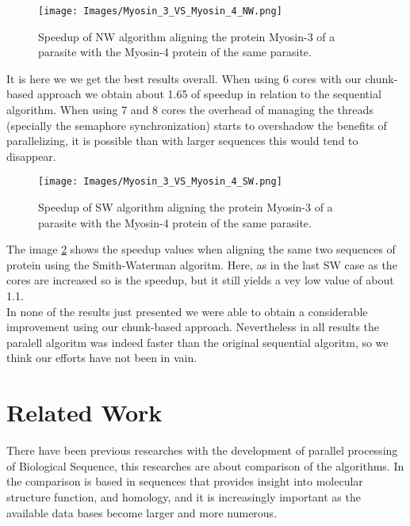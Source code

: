 \documentclass[journal]{IEEEtran}
\begin{document}
\begin{figure}[h]
  \begin{center}
    \texttt{[image: Images/Myosin\_3\_VS\_Myosin\_4\_NW.png]}
  \end{center}
  \caption{Speedup of NW algorithm aligning the protein Myosin-3 of a parasite with the Myosin-4 protein of the same parasite.}
  \label{fig:Myosin3_VS_Myosin4_NW}
\end{figure}

It is here we we get the best results overall. When using 6 cores with our chunk-based approach we obtain about 1.65 of speedup in relation to the sequential algorithm. When using 7 and 8 cores the overhead of managing the threads (specially the semaphore synchronization) starts to overshadow the benefits of parallelizing, it is possible than with larger sequences this would tend to disappear. 

\begin{figure}[h]
  \begin{center}
    \texttt{[image: Images/Myosin\_3\_VS\_Myosin\_4\_SW.png]}
  \end{center}
  \caption{Speedup of SW algorithm aligning the protein Myosin-3 of a parasite with the Myosin-4 protein of the same parasite.}
  \label{fig:Myosin3_VS_Myosin4_SW}
\end{figure}

The image \ref{fig:Myosin3_VS_Myosin4_SW} shows the speedup values when aligning the same two sequences of protein using the Smith-Waterman algoritm. Here, as in the last SW case as the cores are increased so is the speedup, but it still yields a vey low value of about 1.1. \\

In none of the results just presented we were able to obtain a considerable improvement using our chunk-based approach. Nevertheless in all results the paralell algoritm was indeed faster than the original sequential algoritm, so we think our efforts have not been in vain. 

\section{Related Work}

There have been previous researches with the development of parallel processing of Biological Sequence, this researches are about comparison of the algorithms. In \cite{edmiston1988parallel} the comparison is based in sequences that provides insight into molecular structure function, and homology, and it is increasingly important as the available data bases become larger and more numerous.
\end{document}
